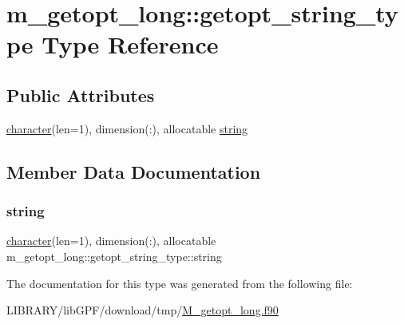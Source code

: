 \hypertarget{structm__getopt__long_1_1getopt__string__type}{}\section{m\+\_\+getopt\+\_\+long\+:\+:getopt\+\_\+string\+\_\+type Type Reference}
\label{structm__getopt__long_1_1getopt__string__type}
\subsection*{Public Attributes}
\begin{DoxyCompactItemize}
\item 
\hyperlink{option__stopwatch_83_8txt_abd4b21fbbd175834027b5224bfe97e66}{character}(len=1), dimension(\+:), allocatable \hyperlink{structm__getopt__long_1_1getopt__string__type_a031154548184a9813ed776aa3286d690}{string}
\end{DoxyCompactItemize}


\subsection{Member Data Documentation}
\mbox{\label{structm__getopt__long_1_1getopt__string__type_a031154548184a9813ed776aa3286d690}} 
\subsubsection{\texorpdfstring{string}{string}}
{\footnotesize\ttfamily \hyperlink{option__stopwatch_83_8txt_abd4b21fbbd175834027b5224bfe97e66}{character}(len=1), dimension(\+:), allocatable m\+\_\+getopt\+\_\+long\+::getopt\+\_\+string\+\_\+type\+::string}



The documentation for this type was generated from the following file\+:\begin{DoxyCompactItemize}
\item 
L\+I\+B\+R\+A\+R\+Y/lib\+G\+P\+F/download/tmp/\hyperlink{M__getopt__long_8f90}{M\+\_\+getopt\+\_\+long.\+f90}\end{DoxyCompactItemize}
